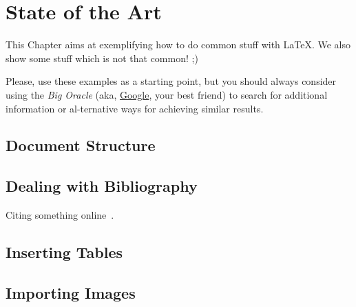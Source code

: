 
%

\makeatletter
\newcommand{\ntifpkgloaded}{%
  \@ifpackageloaded%
}
\makeatother


\chapter{State of the Art}
\label{cha:state_of_the_art}

This Chapter aims at exemplifying how to do common stuff with \LaTeX. We also show some stuff which is not that common! ;)

Please, use these examples as a starting point, but you should always consider using the \emph{Big Oracle} (aka, \href{http://www.google.com}{Google}, your best friend) to search for additional information or al-ternative ways for achieving similar results.

\section{Document Structure} %
\label{sec:document_structure}



\section{Dealing with Bibliography} %
\label{sec:dealing_with_bibliography}

Citing something online~\cite{wiki:shuntingyard,flex,bison}.



\section{Inserting Tables} %
\label{sec:inserting_tables}



\section{Importing Images} %
\label{sec:importing_images}


